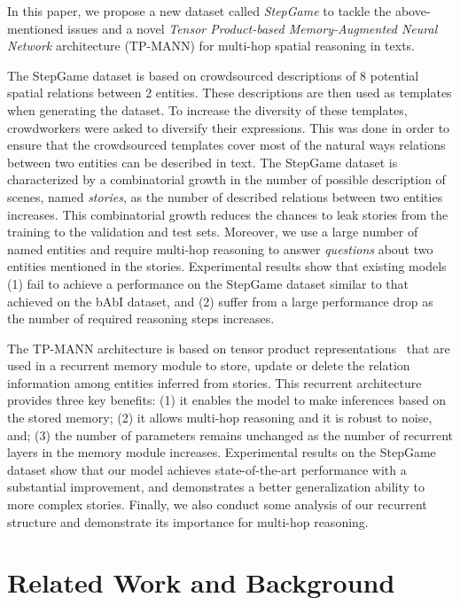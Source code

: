 \documentclass[letterpaper]{article} \usepackage{aaai22}  \usepackage{times}  \usepackage{helvet}  \usepackage{courier}  \usepackage[hyphens]{url}  \usepackage{graphicx} \urlstyle{rm} \def\UrlFont{\rm}  \usepackage{natbib}  \usepackage{caption} \DeclareCaptionStyle{ruled}{labelfont=normalfont,labelsep=colon,strut=off} \frenchspacing  \setlength{\pdfpagewidth}{8.5in}  \setlength{\pdfpageheight}{11in}  \usepackage{algorithm}
\begin{document}
In this paper, we propose a new dataset called \textit{StepGame} to tackle the above-mentioned issues and a novel \textit{Tensor Product-based Memory-Augmented Neural Network} architecture (TP-MANN) for multi-hop spatial reasoning in texts.  

The StepGame dataset is based on crowdsourced descriptions of 
8 potential spatial relations between 2 entities.
These descriptions are then used as templates when generating the dataset. 
To increase the diversity of these templates, crowdworkers were asked to diversify their expressions. 
This was done in order to ensure that the crowdsourced templates cover most of the natural ways relations between two entities can be described in text.
The StepGame dataset is characterized by a combinatorial growth in the number of possible description of scenes, named \textit{stories}, as the number of described relations between two entities increases. 
This combinatorial growth reduces the chances to leak stories from the training to the validation and test sets. 
Moreover, we use a large number of named entities and 
require multi-hop reasoning to answer \textit{questions} about two entities mentioned in the stories. Experimental results show that existing models (1) fail to achieve a performance on the StepGame dataset similar to that achieved on the bAbI dataset, and (2) suffer from a large performance drop as the number of required reasoning steps increases.

The TP-MANN architecture is based on tensor product representations~\cite{smolensky1990tensor} that are used in a recurrent memory module to store, update or delete the relation information among entities inferred from stories. 
This recurrent architecture provides three key benefits: 
(1) it enables the model to make inferences based on the stored memory; (2) it allows multi-hop reasoning and it is robust to noise, and; (3) the number of parameters remains unchanged as the number of recurrent layers in the memory module increases.
Experimental results on the StepGame dataset show that 
our model achieves state-of-the-art performance with a substantial improvement, and demonstrates a better generalization ability to more complex stories. 
Finally, we also conduct some analysis of our recurrent structure and demonstrate its importance for multi-hop reasoning.



 
\section{Related Work and Background}
\end{document}
